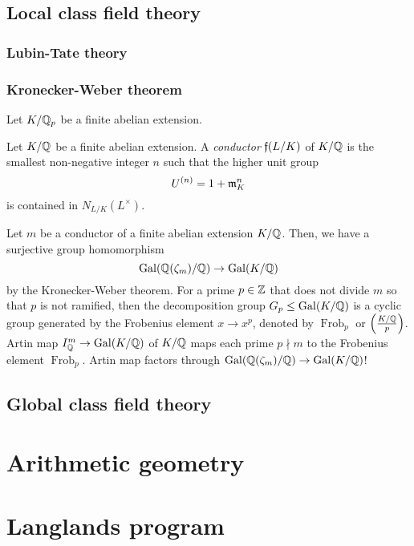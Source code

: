 \documentclass{../../large}
\DeclareMathOperator{\Frob}{Frob}
\begin{document}
\chapter{Local class field theory}
\section{Lubin-Tate theory}
\section{Kronecker-Weber theorem}
\begin{prb}
Let $K/\mathbb{Q}_p$ be a finite abelian extension.

\end{prb}





Let $K/\mathbb{Q}$ be a finite abelian extension.
A \emph{conductor} $\mathfrak{f}(L/K)$ of $K/\mathbb{Q}$ is the smallest non-negative integer $n$ such that the higher unit group
\[U^{(n)}=1+\mathfrak{m}_K^n\]
is contained in $N_{L/K}(L^\times)$.

Let $m$ be a conductor of a finite abelian extension $K/\mathbb{Q}$.
Then, we have a surjective group homomorphism
\[\operatorname{Gal}(\mathbb{Q}(\zeta_m)/\mathbb{Q})\to\operatorname{Gal}(K/\mathbb{Q})\]
by the Kronecker-Weber theorem.
For a prime $p\in\mathbb{Z}$ that does not divide $m$ so that $p$ is not ramified, then the decomposition group $G_p\le\operatorname{Gal}(K/\mathbb{Q})$ is a cyclic group generated by the Frobenius element $x\to x^p$, denoted by $\Frob_p$ or $\left(\frac{K/\mathbb{Q}}p\right)$.
Artin map $I_{\mathbb{Q}}^m\to\operatorname{Gal}(K/\mathbb{Q})$ of $K/\mathbb{Q}$ maps each prime $p\nmid m$ to the Frobenius element $\Frob_p$.
Artin map factors through $\operatorname{Gal}(\mathbb{Q}(\zeta_m)/\mathbb{Q})\to\operatorname{Gal}(K/\mathbb{Q})$!


\chapter{Global class field theory}



\chapter{}




\part{Arithmetic geometry}

\part{Langlands program}
\end{document}
